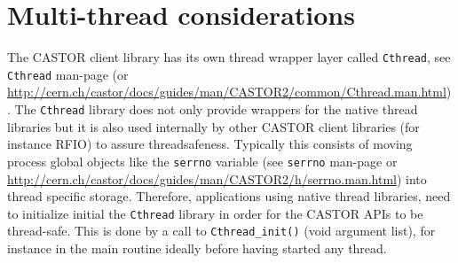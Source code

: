 \section{Multi-thread considerations}
The CASTOR client library has its own thread wrapper layer called {\tt Cthread}, see
{\tt Cthread} man-page (or
\url{http://cern.ch/castor/docs/guides/man/CASTOR2/common/Cthread.man.html}). The {\tt Cthread}
library does not only provide wrappers for the native thread libraries but it is also used
internally by other CASTOR client libraries (for instance RFIO) to assure threadsafeness. Typically
this consists of moving process global objects like the {\tt serrno} variable (see {\tt serrno}
man-page or \url{http://cern.ch/castor/docs/guides/man/CASTOR2/h/serrno.man.html})
into thread specific storage. Therefore, applications using native thread libraries, need to
initialize initial the {\tt Cthread} library in order for the CASTOR APIs to be thread-safe. This
is done by a call to {\tt Cthread\_init()} (void argument list), for instance in the main routine ideally before having
started any thread.
